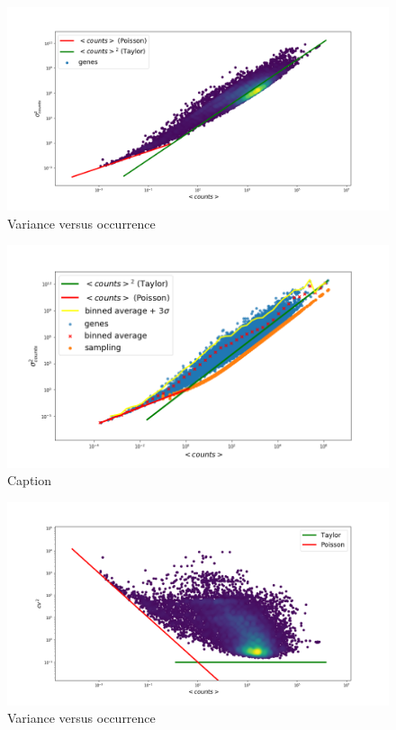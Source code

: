 
\begin{figure}[htb!]
    \centering
    \includegraphics[width=0.9\linewidth]{pictures/scalelaws/gtex/varmean_loglog_density.png}
    \caption{Variance versus occurrence}
    \label{fig:scalelaws/gtex/varmean_loglog_density}
\end{figure}

\begin{figure}[htb!]
    \centering
    \includegraphics[width=0.9\linewidth]{pictures/scalelaws/gtex/varmean_3sigma.png}
    \caption{Caption}
    \label{fig:scalelaws/gtex/varmean_3sigma}
\end{figure}

\begin{figure}[htb!]
    \centering
    \includegraphics[width=0.9\linewidth]{pictures/scalelaws/gtex/cvmean_loglog_density.png}
    \caption{Variance versus occurrence}
    \label{fig:scalelaws/gtex/cvmean_loglog}
\end{figure}

